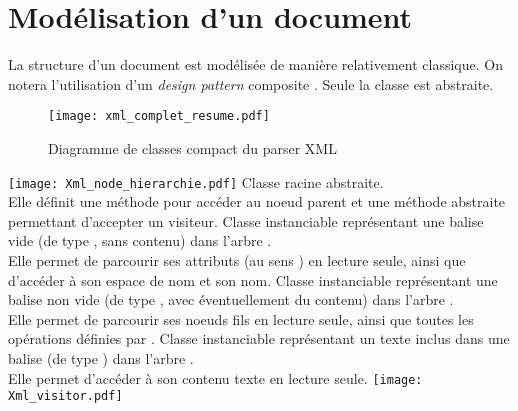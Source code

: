 \section{Modélisation d'un document \xml}
La structure d'un document \xml est modélisée de manière relativement classique. On notera l'utilisation d'un \emph{design pattern} \og composite \fg.
Seule la classe  est abstraite.
\begin{figure}[H]
\texttt{[image: xml\_complet\_resume.pdf]}
\caption{Diagramme de classes compact du parser XML}
\end{figure}

\texttt{[image: Xml\_node\_hierarchie.pdf]}
Classe racine abstraite. \\
Elle définit une méthode pour accéder au noeud parent et une méthode abstraite permettant d'accepter un visiteur.
Classe instanciable représentant une balise vide (de type , sans contenu) dans l'arbre \xml. \\
Elle permet de parcourir ses attributs (au sens \xml) en lecture seule, ainsi que d'accéder à son espace de nom et son nom.
Classe instanciable représentant une balise non vide (de type , avec éventuellement du contenu) dans l'arbre \xml. \\
Elle permet de parcourir ses noeuds fils en lecture seule, ainsi que toutes les opérations définies par .
Classe instanciable représentant un texte inclus dans une balise (de type ) dans l'arbre \xml. \\
Elle permet d'accéder à son contenu texte en lecture seule.
\texttt{[image: Xml\_visitor.pdf]}
